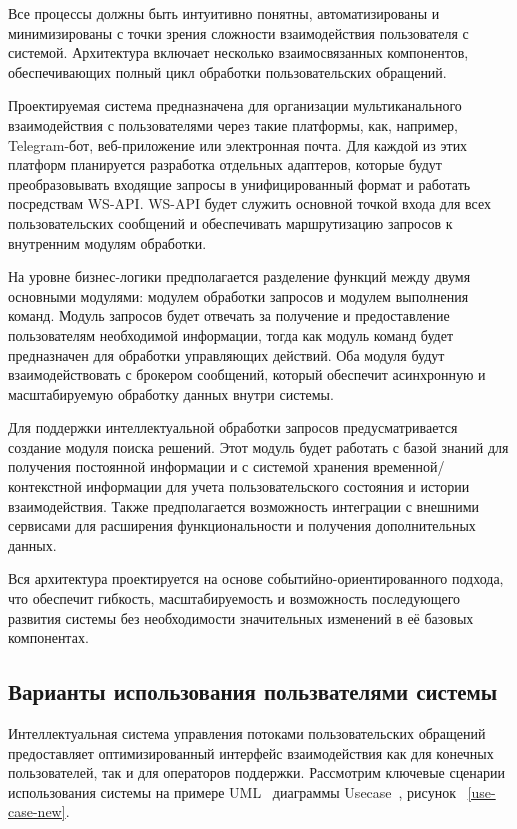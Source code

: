 Все процессы должны быть интуитивно понятны, автоматизированы и минимизированы с точки зрения сложности взаимодействия пользователя с системой. Архитектура включает несколько взаимосвязанных компонентов, обеспечивающих полный цикл обработки пользовательских обращений.


Проектируемая система предназначена для организации мультиканального взаимодействия с пользователями через такие платформы, как, например, Telegram-бот, веб-приложение или электронная почта. Для каждой из этих платформ планируется разработка отдельных адаптеров, которые будут преобразовывать входящие запросы в унифицированный формат и работать посредствам WS-API. WS-API будет служить основной точкой входа для всех пользовательских сообщений и обеспечивать маршрутизацию запросов к внутренним модулям обработки.

На уровне бизнес-логики предполагается разделение функций между двумя основными модулями: модулем обработки запросов и модулем выполнения команд. Модуль запросов будет отвечать за получение и предоставление пользователям необходимой информации, тогда как модуль команд будет предназначен для обработки управляющих действий. Оба модуля будут взаимодействовать с брокером сообщений, который обеспечит асинхронную и масштабируемую обработку данных внутри системы.

Для поддержки интеллектуальной обработки запросов предусматривается создание модуля поиска решений. Этот модуль будет работать с базой знаний для получения постоянной информации и с системой хранения временной/контекстной информации для учета пользовательского состояния и истории взаимодействия. Также предполагается возможность интеграции с внешними сервисами для расширения функциональности и получения дополнительных данных.

Вся архитектура проектируется на основе событийно-ориентированного подхода, что обеспечит гибкость, масштабируемость и возможность последующего развития системы без необходимости значительных изменений в её базовых компонентах.


\subsection{Варианты использования пользвателями системы}

Интеллектуальная система управления потоками пользовательских обращений предоставляет оптимизированный интерфейс взаимодействия как для конечных пользователей, так и для операторов поддержки. Рассмотрим ключевые сценарии использования системы на примере UML~\cite{Uml} диаграммы Usecase~\cite{Usecase}, рисунок ~\ref{use-case-new}.

